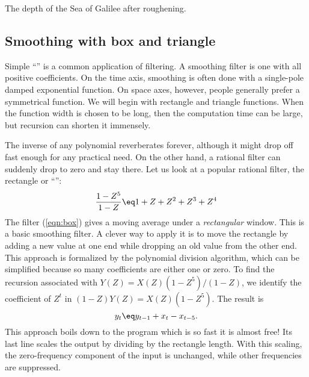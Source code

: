 %
{}

 {
  The depth of the Sea of Galilee after roughening.
}

%

\subsection{Smoothing with box and triangle}
%
Simple ``'' is a common application of filtering.  A
smoothing filter is one with all positive coefficients.  On the time
axis, smoothing is often done with a single-pole damped exponential
function.  On space axes, however, people generally prefer a
symmetrical function.  We will begin with rectangle and triangle
functions. When the function width is chosen to be long, then the
computation time can be large, but recursion can shorten it
immensely. 
%
\par
%
The inverse of any polynomial reverberates forever, although it might
drop off fast enough for any practical need.  On the other hand, a
rational filter can suddenly drop to zero and stay there.  Let us look
at a popular rational filter, the rectangle or ``'': 
\begin{equation}
{ \frac{1- Z^5}{ 1-Z} } \eq 1+Z+Z^2+Z^3+Z^4	\label{eqn:box}
\end{equation}
The filter (\ref{eqn:box}) gives a moving average under a {\em
rectangular} window.  This is a basic smoothing filter.  A clever
way to apply it is to move the rectangle by adding a new value at one
end while dropping an old value from the other end.  This approach is
formalized by the polynomial division algorithm, which can be
simplified because so many coefficients are either one or zero.  To
find the recursion associated with $Y(Z)= X(Z)(1-Z^5)/(1-Z)$, we
identify the coefficient of $Z^t$ in $(1-Z)Y(Z)= X(Z)(1-Z^5)$.  The
result is 
\begin{equation}
y_t \eq  y_{t-1} + x_t - x_{t-5}.
\end{equation}
This approach boils down to the program %
which is so fast it is almost free!
Its last line scales the output by dividing by the rectangle length.
With this scaling, the zero-frequency component of the input is
unchanged, while other frequencies are suppressed. 

